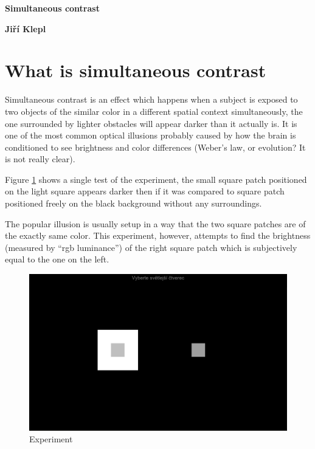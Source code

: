 \documentclass[a4paper,12pt]{article} %
\begin{document}
\thispagestyle{empty}

\begin{center}
    {\Large \bf Simultaneous contrast}
    \vspace{2mm}

    {\bf Jiří Klepl}
\end{center}

\section{What is simultaneous contrast}

Simultaneous contrast is an effect which happens when a subject is exposed to two objects of the similar color in a different spatial context simultaneously, the one surrounded by lighter obstacles will appear darker than it actually is. It is one of the most common optical illusions probably caused by how the brain is conditioned to see brightness and color differences (Weber's law, or evolution? It is not really clear).

Figure \ref{experiment_png} shows a single test of the experiment, the small square patch positioned on the light square appears darker then if it was compared to square patch positioned freely on the black background without any surroundings.

The popular illusion is usually setup in a way that the two square patches are of the exactly same color. This experiment, however, attempts to find the brightness (measured by ``rgb luminance'') of the right square patch which is subjectively equal to the one on the left.

\begin{figure}[htb!]
    \centering
    \caption{Experiment}
    \label{experiment_png}
    \includegraphics[width=\linewidth]{experiment.png}
\end{figure}
\end{document}
